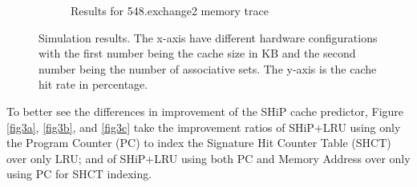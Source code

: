 \documentclass[letterpaper, 11pt]{article}
\begin{document}
\begin{figure}[htb!]
\begin{subfigure}[b]{.6\linewidth}
			\caption{Results for 548.exchange2 memory trace}
			\label{fig2c}
		\end{subfigure}
		\caption{Simulation results. The x-axis have different hardware configurations with the first number being the cache size in KB and the second number being the number of associative sets. The y-axis is the cache hit rate in percentage.}
	\end{figure}

	\newpage
	
	
	To better see the differences in improvement of the SHiP cache predictor, Figure \ref{fig3a}, \ref{fig3b}, and \ref{fig3c} take the improvement ratios of SHiP+LRU using only the Program Counter (PC) to index the Signature Hit Counter Table (SHCT) over only LRU; and of SHiP+LRU using both PC and Memory Address over only using PC for SHCT indexing.
	
\end{document}
